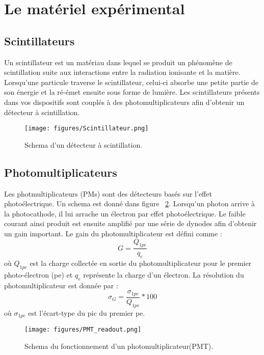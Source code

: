 \section{Le matériel expérimental}

\subsection{Scintillateurs}
\label{subsec:scint}

Un scintillateur est un matériau dans lequel se produit un phénomène de scintillation suite aux interactions entre la radiation ionisante et la matière. Lorsqu'une particule traverse le scintillateur, celui-ci absorbe une petite partie de son énergie et la ré-émet ensuite sous forme de lumière. Les scintillateurs présents dans vos dispositifs sont couplés à des photomultiplicateurs afin d'obtenir un détecteur à scintillation.

\begin{figure}[h]
    \centering
	\texttt{[image: figures/Scintillateur.png]}
    \caption{Schema d'un détecteur à scintillation.}
    \label{fig:Scintillateur} 
\end{figure}

\FloatBarrier

\subsection{Photomultiplicateurs}
\label{subsec:PMT}
Les photmultiplicateurs (PMs) sont des détecteurs basés sur l'effet photoélectrique. Un schema est donné dans figure ~\ref{fig:PMT_readout}. Lorsqu'un photon arrive à la photocathode, il lui arrache un électron par effet photoélectrique. Le faible courant ainsi produit est ensuite amplifié par une série de dynodes afin d'obtenir un gain important. Le gain du photomultiplicateur est défini comme :
\begin{equation}
G = \frac{Q_{1pe}}{q_{e}} 
\end{equation}
où $Q_{1pe}$ est la charge collectée en sortie du photomultiplicateur pour le premier photo-électron (pe) et $q_{e}$ représente la charge d'un électron. La résolution du photomultiplicateur est donnée par :
\begin{equation}
\sigma_{G} =  \frac{\sigma_{1pe}}{Q_{1pe}} * 100
\end{equation}
où $\sigma_{1pe}$ est l'écart-type du pic du premier pe.

\begin{figure}
    \centering
	\texttt{[image: figures/PMT\_readout.png]}
    \caption{Schema du fonctionnement d'un photomultiplicateur(PMT).}
    \label{fig:PMT_readout} 
\end{figure}


